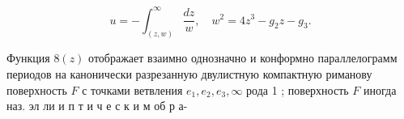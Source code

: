 \documentclass[10pt]{article}
\begin{document}
\[

u=-\int_{(z, w)}^{\infty} \frac{d z}{w}, \quad w^{2}=4 z^{3}-g_{2} z-g_{3} .

\]



Функция $8(z)$ отображает взаимно однозначно и конформно параллелограмм периодов на канонически разрезанную двулистную компактную риманову поверхность $F$ с точками ветвления $e_{1}, e_{2}, e_{3}, \infty$ рода 1 ; поверхность $F$ иногда наз. эл ли и п т и ч е с к и м об р а-
\end{document}
